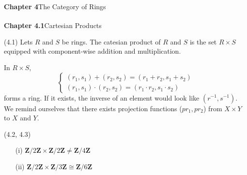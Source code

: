 \vspace{2ex}
{\bf Chapter 4}\hspace{2ex}The Category of Rings\\\\
{\bf Chapter 4.1}\hspace{2ex}Cartesian Products
\\
\begin{defi}
(4.1) Lets $R$ and $S$ be rings. The catesian product of $R$ and $S$ is the set $R\times S$ equipped with component-wise addition and multiplication. 
\end{defi}
\vspace{2ex}
\begin{rmk}
In $R\times S$,
\[\begin{cases}
	(r_1,s_1)+(r_2,s_2)=(r_1+r_2,s_1+s_2)\\
(r_1,s_1)\cdot (r_2,s_2)=(r_1\cdot r_2,s_1\cdot s_2)
\end{cases}\]
forms a ring. If it exists, the inverse of an element would look like $(r^{-1},s^{-1})$. We remind ourselves that there exists projection functions ($pr_{1},pr_{2}$) from $X\times Y$ to $X$ and $Y$. 
\end{rmk}
\vspace{2ex}
\begin{ex}
 (4.2, 4.3)
\begin{itemize}
	\item[(i)] ${\bm Z}/2{\bm Z}\times {\bm Z}/2{\bm Z}\ne {\bm Z}/4{\bm Z}$
	\item[(ii)] ${\bm Z}/2{\bm Z}\times {\bm Z}/3{\bm Z}\cong {\bm Z}/6{\bm Z}$
\end{itemize}
\end{ex}
\vspace{2ex}
